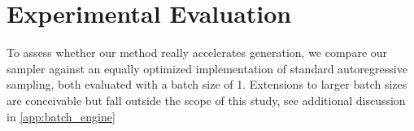 \documentclass{article} %
\theoremstyle{definition}
\theoremstyle{plain}
\begin{document}
\section{Experimental Evaluation}\label{sec:experiments}
To assess whether our method really accelerates generation, we compare our sampler against an equally optimized implementation of standard autoregressive sampling, both evaluated with a batch size of 1. Extensions to larger batch sizes are conceivable but fall outside the scope of this study, see additional discussion in \cref{app:batch_engine} %
\end{document}

